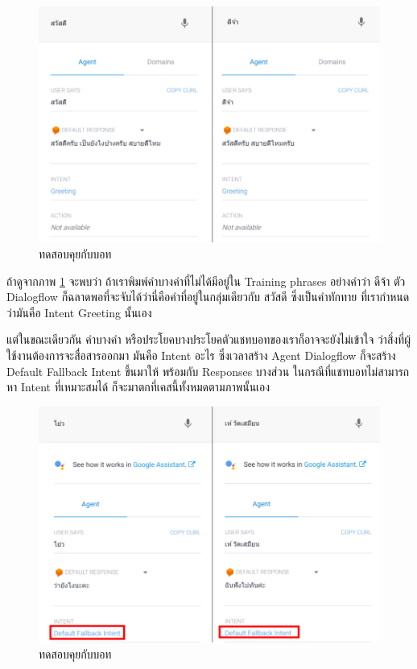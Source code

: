 \begin{enumerate}
	\begin{figure}[H]
		\centering
		\includegraphics[width=0.9\columnwidth]{Figures/2/dialogflow_5}
		\caption{ทดสอบคุยกับบอท}
		\label{Fig:dialogflow5}
	\end{figure}

ถ้าดูจากภาพ \ref{Fig:dialogflow5} จะพบว่า ถ้าเราพิมพ์คำบางคำที่ไม่ได้มีอยู่ใน Training phrases อย่างคำว่า ดีจ้า ตัว Dialogflow ก็ฉลาดพอที่จะจับได้ว่านี่คือคำที่อยู่ในกลุ่มเดียวกับ สวัสดี ซึ่งเป็นคำทักทาย ที่เรากำหนดว่ามันคือ Intent Greeting นั้นเอง

แต่ในขณะเดียวกัน คำบางคำ หรือประโยคบางประโยคตัวแชทบอทของเราก็อาจจะยังไม่เข้าใจ ว่าสิ่งที่ผู้ใช้งานต้องการจะสื่อสารออกมา มันคือ Intent อะไร ซึ่งเวลาสร้าง Agent Dialogflow ก็จะสร้าง Default Fallback Intent ขึ้นมาให้ พร้อมกับ Responses บางส่วน ในกรณีที่แชทบอทไม่สามารถหา Intent ที่เหมาะสมได้ ก็จะมาตกที่เคสนี้ทั้งหมดตามภาพนั้นเอง

	\begin{figure}[H]
		\centering
		\includegraphics[width=0.9\columnwidth]{Figures/2/dialogflow_6}
		\caption{ทดสอบคุยกับบอท}
		\label{Fig:dialogflow6}
	\end{figure}
\end{enumerate}

